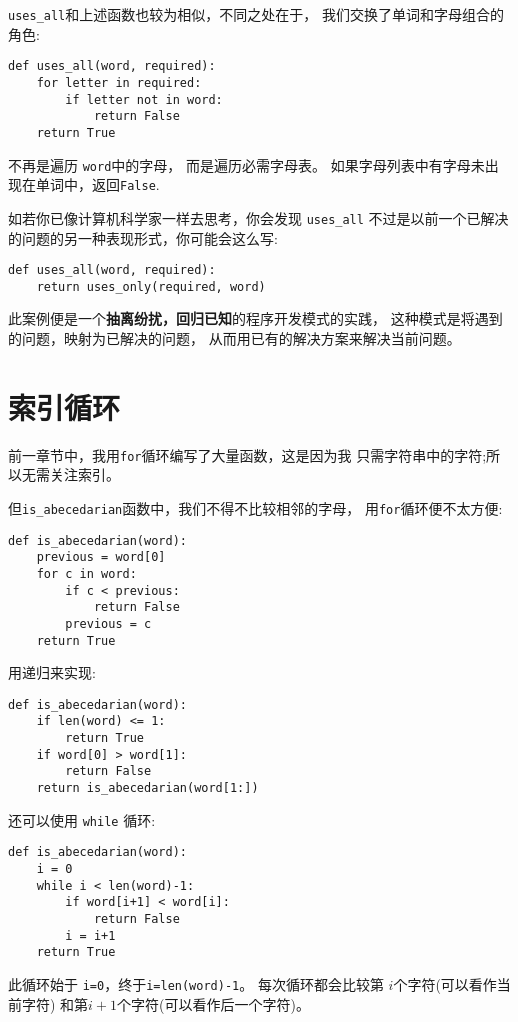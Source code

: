 \documentclass[10pt]{book}
\begin{document}
\verb"uses_all"和上述函数也较为相似，不同之处在于，
我们交换了单词和字母组合的角色:

\begin{verbatim}
def uses_all(word, required):
    for letter in required: 
        if letter not in word:
            return False
    return True
\end{verbatim}
%
不再是遍历 {\tt word}中的字母，
而是遍历必需字母表。
如果字母列表中有字母未出现在单词中，返回{\tt False}.

如若你已像计算机科学家一样去思考，你会发现 \verb"uses_all" 
不过是以前一个已解决的问题的另一种表现形式，你可能会这么写:

\begin{verbatim}
def uses_all(word, required):
    return uses_only(required, word)
\end{verbatim}
%
此案例便是一个{\bf 抽离纷扰，回归已知}的程序开发模式的实践，
这种模式是将遇到的问题，映射为已解决的问题，
从而用已有的解决方案来解决当前问题。  


\section{索引循环}
前一章节中，我用{\tt for}循环编写了大量函数，这是因为我
只需字符串中的字符;所以无需关注索引。

 但\verb"is_abecedarian"函数中，我们不得不比较相邻的字母，
用{\tt for}循环便不太方便:

\begin{verbatim}
def is_abecedarian(word):
    previous = word[0]
    for c in word:
        if c < previous:
            return False
        previous = c
    return True
\end{verbatim}

用递归来实现:

\begin{verbatim}
def is_abecedarian(word):
    if len(word) <= 1:
        return True
    if word[0] > word[1]:
        return False
    return is_abecedarian(word[1:])
\end{verbatim}

还可以使用 {\tt while} 循环:

\begin{verbatim}
def is_abecedarian(word):
    i = 0
    while i < len(word)-1:
        if word[i+1] < word[i]:
            return False
        i = i+1
    return True
\end{verbatim}
%
此循环始于 {\tt i=0}，终于{\tt i=len(word)-1}。
每次循环都会比较第 $i$个字符(可以看作当前字符)
和第$i+1$个字符(可以看作后一个字符)。
\end{document}
